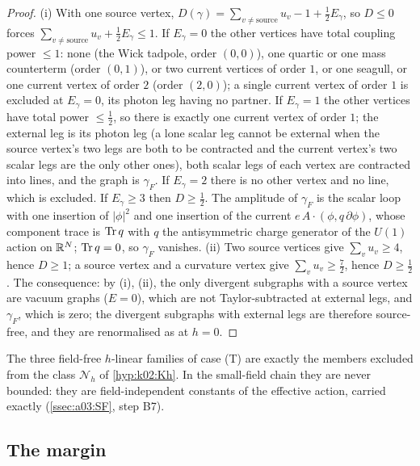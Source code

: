 \begin{proof}
(i) With one source vertex, $D(\gamma)=\sum_{v\ne\text{source}}u_v-1+\frac12E_\gamma$, so $D\le0$ forces $\sum_{v\ne\text{source}}u_v+\frac12E_\gamma\le1$. If $E_\gamma=0$ the other vertices have total coupling power $\le1$: none (the Wick tadpole, order $(0,0)$), one quartic or one mass counterterm (order $(0,1)$), or two current vertices of order $1$, or one seagull, or one current vertex of order $2$ (order $(2,0)$); a single current vertex of order $1$ is excluded at $E_\gamma=0$, its photon leg having no partner. If $E_\gamma=1$ the other vertices have total power $\le\frac12$, so there is exactly one current vertex of order $1$; the external leg is its photon leg (a lone scalar leg cannot be external when the source vertex's two legs are both to be contracted and the current vertex's two scalar legs are the only other ones), both scalar legs of each vertex are contracted into lines, and the graph is $\gamma_F$. If $E_\gamma=2$ there is no other vertex and no line, which is excluded. If $E_\gamma\ge3$ then $D\ge\frac12$. The amplitude of $\gamma_F$ is the scalar loop with one insertion of $|\phi|^2$ and one insertion of the current $e\,A\cdot(\phi,q\,\partial\phi)$, whose component trace is $\operatorname{Tr} q$ with $q$ the antisymmetric charge generator of the $U(1)$ action on $\mathbb R^N$; $\operatorname{Tr} q=0$, so $\gamma_F$ vanishes. (ii) Two source vertices give $\sum_vu_v\ge4$, hence $D\ge1$; a source vertex and a curvature vertex give $\sum_vu_v\ge\frac72$, hence $D\ge\frac12$. The consequence: by (i), (ii), the only divergent subgraphs with a source vertex are vacuum graphs ($E=0$), which are not Taylor-subtracted at external legs, and $\gamma_F$, which is zero; the divergent subgraphs with external legs are therefore source-free, and they are renormalised as at $h=0$.
\end{proof}

The three field-free $h$-linear families of case (T) are exactly the members excluded from the class $\mathcal N_h$ of \cref{hyp:k02:Kh}. In the small-field chain they are never bounded: they are field-independent constants of the effective action, carried exactly (\cref{ssec:a03:SF}, step B7).

\subsection{The margin}\label{ssec:a03:D}

